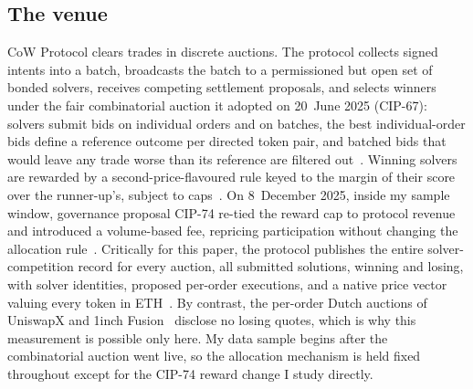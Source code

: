 \documentclass[11pt]{article}
\theoremstyle{plain}
\theoremstyle{definition}
\theoremstyle{remark}
\begin{document}
\subsection{The venue}\label{sec:venue}
CoW Protocol clears trades in discrete auctions. The protocol collects signed intents into a batch, broadcasts the batch to a permissioned but open set of bonded solvers, receives competing settlement proposals, and selects winners under the fair combinatorial auction it adopted on 20~June 2025 (CIP-67): solvers submit bids on individual orders and on batches, the best individual-order bids define a reference outcome per directed token pair, and batched bids that would leave any trade worse than its reference are filtered out~\citep{cowdao_rules,cowdao_fairauction}. Winning solvers are rewarded by a second-price-flavoured rule keyed to the margin of their score over the runner-up's, subject to caps~\citep{cowdao_rewards}. On 8~December 2025, inside my sample window, governance proposal CIP-74 re-tied the reward cap to protocol revenue and introduced a volume-based fee, repricing participation without changing the allocation rule~\citep{zhang2026incentives}. Critically for this paper, the protocol publishes the entire solver-competition record for every auction, all submitted solutions, winning and losing, with solver identities, proposed per-order executions, and a native price vector valuing every token in ETH~\citep{cow_api}. By contrast, the per-order Dutch auctions of UniswapX and 1inch Fusion~\citep{adams2023uniswapx} disclose no losing quotes, which is why this measurement is possible only here. My data sample begins after the combinatorial auction went live, so the allocation mechanism is held fixed throughout except for the CIP-74 reward change I study directly.
\end{document}
